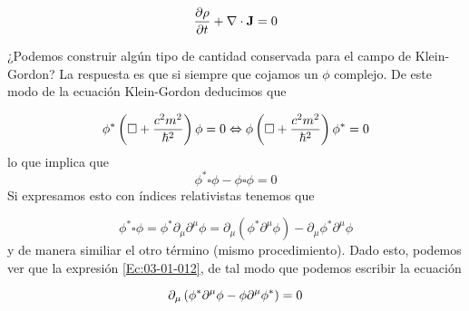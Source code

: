 \begin{equation}
    \frac{\partial \rho}{\partial t} + \nabla \cdot \mathbf{J} = 0
\end{equation}

¿Podemos construir algún tipo de cantidad conservada para el campo de Klein-Gordon? La respuesta es que si siempre que cojamos un $\phi$ complejo. De este modo de la ecuación Klein-Gordon deducimos que 

\begin{equation}
    \phi^* \left( \square + \frac{c^2m^2}{\hbar^2} \right) \phi = 0 \Leftrightarrow 
    \phi \left( \square + \frac{c^2m^2}{\hbar^2} \right) \phi^* = 0 
\end{equation}
lo que implica que
\begin{equation}
\phi^*\square \phi - \phi \square \phi = 0 \label{Ec:03-01-012}
\end{equation}
Si expresamos esto con índices relativistas tenemos que 

\begin{equation}
    \phi^* \square \phi = \phi^* \partial_\mu \partial^\mu \phi = \partial_\mu (\phi^* \partial^\mu \phi) - \partial_\mu \phi^* \partial^\mu \phi
\end{equation}
y de manera similiar el otro término (mismo procedimiento). Dado esto, podemos ver que la expresión \ref{Ec:03-01-012}, de tal modo que podemos escribir la ecuación 

\begin{equation}
    \partial_\mu \left( \phi^* \partial^\mu \phi - \phi \partial^\mu \phi^* \right) = 0
\end{equation}
